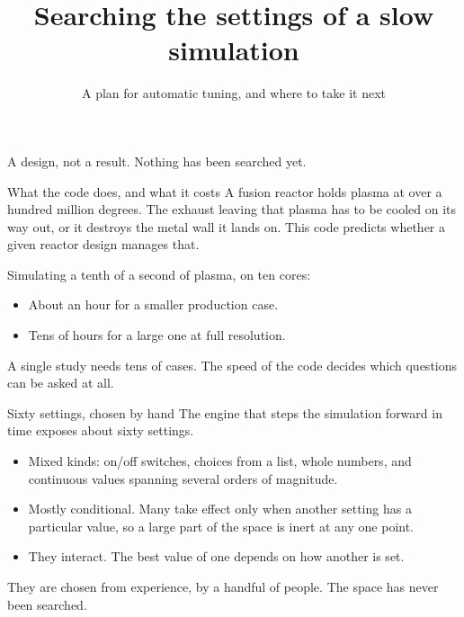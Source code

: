 \documentclass[aspectratio=169,11pt]{beamer}
\title{Searching the settings of a slow simulation}
\subtitle{A plan for automatic tuning, and where to take it next}
\date{}
\author{}
\begin{document}
\begin{frame}
  \titlepage
  \vspace{-2em}
  \begin{center}
    \small A design, not a result. Nothing has been searched yet.
  \end{center}
\end{frame}

\begin{frame}{What the code does, and what it costs}
  A fusion reactor holds plasma at over a hundred million degrees. The exhaust
  leaving that plasma has to be cooled on its way out, or it destroys the metal
  wall it lands on. This code predicts whether a given reactor design manages
  that.

  \vspace{0.8em}
  Simulating a tenth of a second of plasma, on ten cores:

  \begin{itemize}
    \item About an hour for a smaller production case.
    \item Tens of hours for a large one at full resolution.
  \end{itemize}

  \vspace{0.6em}
  A single study needs tens of cases. The speed of the code decides which
  questions can be asked at all.
\end{frame}

\begin{frame}{Sixty settings, chosen by hand}
  The engine that steps the simulation forward in time exposes about sixty
  settings.

  \begin{itemize}
    \item Mixed kinds: on/off switches, choices from a list, whole numbers, and
          continuous values spanning several orders of magnitude.
    \item Mostly conditional. Many take effect only when another setting has a
          particular value, so a large part of the space is inert at any one
          point.
    \item They interact. The best value of one depends on how another is set.
  \end{itemize}

  \vspace{0.8em}
  They are chosen from experience, by a handful of people. The space has never
  been searched.
\end{frame}
\end{document}
